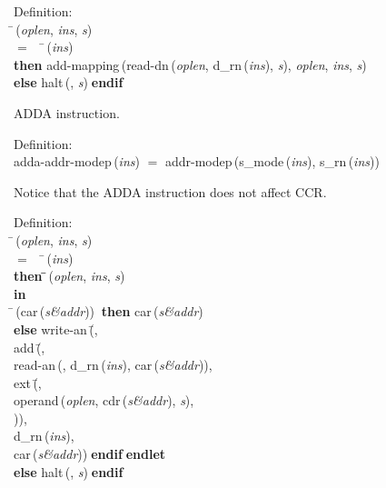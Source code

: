 \begin{tabbing}{\sc Definition}: \\  
\=\,({\it{oplen\/}}, {\it{ins\/}}, {\it{s\/}}) \\ 
$=$$\;\;\;\;$\=\,({\it{ins\/}}) \\ 
{\bf then }{\rm{add-mapping}}\,({\rm{read-dn}}\,({\it{oplen\/}}, {\rm{d\_rn}}\,({\it{ins\/}}), {\it{s\/}}), {\it{oplen\/}}, {\it{ins\/}}, {\it{s\/}}) \\ 
{\bf else }{\rm{halt}}\,({}, {\it{s\/}})$\;${\bf  endif}\-\-
\end{tabbing}

 ADDA instruction.
\begin{tabbing}{\sc Definition}: \\  
{\rm{adda-addr-modep}}\,({\it{ins\/}}) $=$ {\rm{addr-modep}}\,({\rm{s\_mode}}\,({\it{ins\/}}), {\rm{s\_rn}}\,({\it{ins\/}}))
\end{tabbing}

 Notice that the ADDA instruction does not affect CCR.
\begin{tabbing}{\sc Definition}: \\  
\=\,({\it{oplen\/}}, {\it{ins\/}}, {\it{s\/}}) \\ 
$=$$\;\;\;\;$\=\,({\it{ins\/}}) \\ 
{\bf then }\=\=\,({\it{oplen\/}}, {\it{ins\/}}, {\it{s\/}})\- \\ 
{\bf in} \\ 
\=\,({\rm{car}}\,({\it{s\&addr\/}}))$\;\;${\bf then }{\rm{car}}\,({\it{s\&addr\/}}) \\ 
{\bf else }{\rm{write-an}}\,(\=, \\ 
{\rm{add}}\,(\=, \\ 
{\rm{read-an}}\,({}, {\rm{d\_rn}}\,({\it{ins\/}}), {\rm{car}}\,({\it{s\&addr\/}})), \\ 
{\rm{ext}}\,(\=, \\ 
{\rm{operand}}\,({\it{oplen\/}}, {\rm{cdr}}\,({\it{s\&addr\/}}), {\it{s\/}}), \\ 
{})\-)\-, \\ 
{\rm{d\_rn}}\,({\it{ins\/}}), \\ 
{\rm{car}}\,({\it{s\&addr\/}}))\-$\;${\bf  endif}\-$\;${\bf  endlet}\- \\ 
{\bf else }{\rm{halt}}\,({}, {\it{s\/}})$\;${\bf  endif}\-\-
\end{tabbing}

